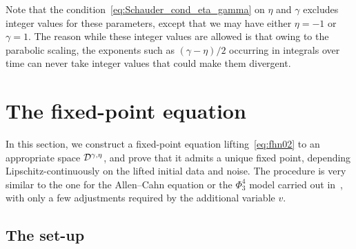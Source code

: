 \documentclass[reqno,11pt]{article}
\begin{document}
\begin{remark}
\label{rem:Schauder_integer}
Note that the condition~\eqref{eq:Schauder_cond_eta_gamma} on $\eta$ and
$\gamma$ excludes integer values for these parameters, except that we may have 
either $\eta=-1$ or $\gamma=1$. The reason while these integer values are
allowed is that owing to the parabolic scaling, the exponents such as
$(\gamma-\eta)/2$ occurring in integrals over time can never take integer
values that could make them divergent. 
\end{remark}


\section{The fixed-point equation}
\label{sec_fix}

In this section, we construct a fixed-point equation lifting~\eqref{eq:fhn02} to
an appropriate space ${\mathcal D}^{\gamma,\eta}$, and prove that it admits a unique
fixed point, depending Lipschitz-continuously on the lifted initial data and
noise. The procedure is very similar to the one for the Allen--Cahn equation or
the $\Phi_3^4$ model carried out in~\cite[Section~9]{Hairer2014}, with only a
few adjustments required by the additional variable $v$. 


\subsection{The set-up}
\label{ssec_fix_setup}
\end{document}
